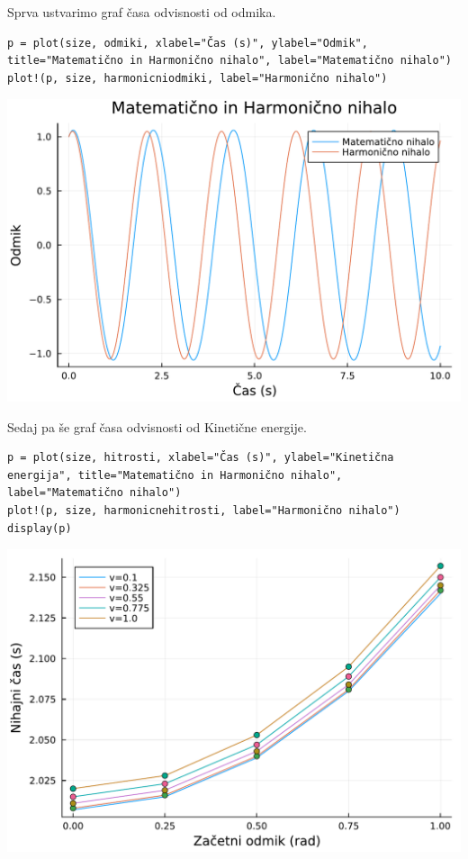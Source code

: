 \documentclass[12pt,a4paper]{article}
\begin{document}
Sprva ustvarimo graf časa odvisnosti od odmika.


\begin{verbatim}
p = plot(size, odmiki, xlabel="Čas (s)", ylabel="Odmik", title="Matematično in Harmonično nihalo", label="Matematično nihalo")
plot!(p, size, harmonicniodmiki, label="Harmonično nihalo")
\end{verbatim}
\includegraphics[width=\linewidth]{jl_xzhxDb/demo_4_1.pdf}

Sedaj pa še graf časa odvisnosti od Kinetične energije.


\begin{verbatim}
p = plot(size, hitrosti, xlabel="Čas (s)", ylabel="Kinetična energija", title="Matematično in Harmonično nihalo", label="Matematično nihalo")
plot!(p, size, harmonicnehitrosti, label="Harmonično nihalo")
display(p)
\end{verbatim}
\includegraphics[width=\linewidth]{jl_xzhxDb/demo_5_1.pdf}
\end{document}

